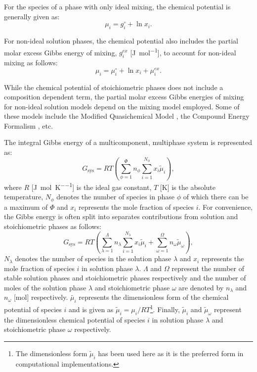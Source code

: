 	For the species of a phase with only ideal mixing, the chemical potential is generally given as:
    	\begin{equation}
        		\mu_{i} = g_{i}^\circ + \ln x_{i}.
    	\end{equation}

	For non-ideal solution phases, the chemical potential also includes the partial molar excess Gibbs energy of mixing, $g_{i}^{ex}$ [\si{\joule \per \mole}], to account for non-ideal mixing as follows:
    	\begin{equation}\label{eq:mu_ex}
        		\mu_{i} = \mu_{i}^\circ + \ln x_{i} + \mu_{i}^{ex}.
    	\end{equation}

    	While the chemical potential of stoichiometric phases does not include a composition dependent term, the partial molar excess Gibbs energies of mixing for non-ideal solution models depend on the mixing model employed. Some of these models include the Modified Quasichemical Model \cite{Pelton00,Pelton01,Chartrand01,Pelton01b,Lambotte11}, the Compound Energy Formalism \cite{Hillert01}, etc.

	The integral Gibbs energy of a multicomponent, multiphase system is represented as:
	\begin{equation}\label{eqn:integralGibbs1}
        		G_\text{sys} = RT \left ( \sum_{\phi=1}^{\Phi} n_{\phi} \sum_{i=1}^{N_{\phi}}x_{i}\tilde{\mu}_i \right ),
    	\end{equation}
	where $R$ [\si{\joule \per \mole \per \kelvin}] is the ideal gas constant, $T$ [\si{\kelvin}] is the absolute temperature, $N_{\phi}$ denotes the number of species in phase $\phi$ of which there can be a maximum of $\Phi$ and $x_{i}$ represents the mole fraction of species $i$. For convenience, the Gibbs energy is often split into separates contributions from solution and stoichiometric phases as follows:
    	\begin{equation}\label{eqn:integralGibbs}
        		G_\text{sys} = RT \left ( \sum_{\lambda=1}^{\Lambda} n_{\lambda} \sum_{i=1}^{N_{\lambda}}x_{i}\tilde{\mu}_i + \sum_{\omega=1}^{\Omega} n_{\omega} \tilde{\mu}_{\omega} \right ),
    	\end{equation}
    	$N_{\lambda}$ denotes the number of species in the solution phase $\lambda$ and $x_{i}$ represents the mole fraction of species $i$ in solution phase $\lambda$. $\Lambda$ and $\Omega$ represent the number of stable solution phases and stoichiometric phases respectively and the number of moles of the solution phase $\lambda$ and stoichiometric phase $\omega$ are denoted by $n_\lambda$ and $n_\omega$ [\si{\mole}] respectively. $\tilde{\mu_i}$ represents the dimensionless form of the chemical potential of species $i$ and is given as $\tilde{\mu}_i = \mu_i / RT$\footnote{The dimensionless form $\tilde{\mu}_i$ has been used here as it is the preferred form in computational implementations.}. Finally, $\tilde{\mu}_i$ and $\tilde{\mu}_\omega$ represent the dimensionless chemical potential of species $i$ in solution phase $\lambda$ and stoichiometric phase $\omega$ respectively.

